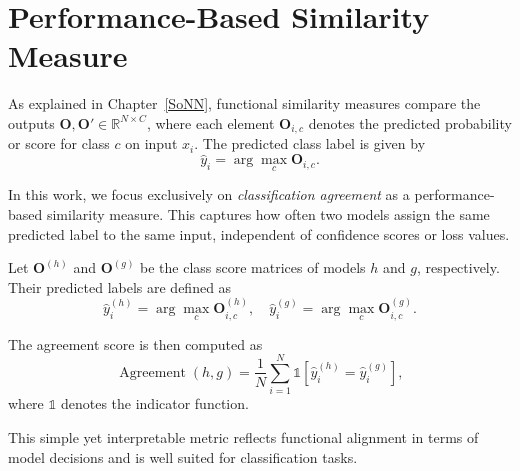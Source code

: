 \section{Performance-Based Similarity Measure}\label{sec:PBSM}

As explained in Chapter~\ref{SoNN}, functional similarity measures compare the outputs \( \mathbf{O}, \mathbf{O}' \in \mathbb{R}^{N\times C} \), where each element \( \mathbf{O}_{i,c} \) denotes the predicted probability or score for class \( c \) on input \( x_i \). The predicted class label is given by
\[
\hat{y}_i = \arg \max_c \mathbf{O}_{i,c}.
\]

In this work, we focus exclusively on \emph{classification agreement} as a performance-based similarity measure. This captures how often two models assign the same predicted label to the same input, independent of confidence scores or loss values.

Let \( \mathbf{O}^{(h)} \) and \( \mathbf{O}^{(g)} \) be the class score matrices of models \( h \) and \( g \), respectively. Their predicted labels are defined as
\[
\hat{y}^{(h)}_i = \arg\max_c \mathbf{O}^{(h)}_{i,c}, \quad
\hat{y}^{(g)}_i = \arg\max_c \mathbf{O}^{(g)}_{i,c}.
\]

The agreement score is then computed as
\[
\operatorname{Agreement}(h, g) = \frac{1}{N} \sum_{i=1}^N \mathds{1} \left[ \hat{y}^{(h)}_i = \hat{y}^{(g)}_i \right],
\]
where \( \mathds{1} \) denotes the indicator function.

This simple yet interpretable metric reflects functional alignment in terms of model decisions and is well suited for classification tasks.




